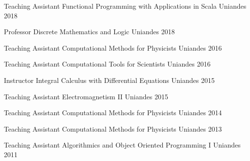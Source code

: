 


\begin{cvhonors}

    \cvhonor
    {Teaching Assistant}
    {Functional Programming with Applications in Scala}
    {Uniandes}
    {2018}

    \cvhonor
    {Professor}
    {Discrete Mathematics and Logic}
    {Uniandes}
    {2018}

    \cvhonor
    {Teaching Assistant} %
    {Computational Methods for Physicists} %
    {Uniandes} %
    {2016} %

    \cvhonor
    {Teaching Assistant} %
    {Computational Tools for Scientists} %
    {Uniandes} %
    {2016} %

    \cvhonor
    {Instructor} %
    {Integral Calculus with Differential Equations} %
    {Uniandes} %
    {2015} %
    
    \cvhonor
    {Teaching Assistant} %
    {Electromagnetism II} %
    {Uniandes} %
    {2015} %
    
    \cvhonor
    {Teaching Assistant} %
    {Computational Methods for Physicists} %
    {Uniandes} %
    {2014} %

    \cvhonor
    {Teaching Assistant} %
    {Computational Methods for Physicists} %
    {Uniandes} %
    {2013} %

    \cvhonor
    {Teaching Assistant} %
    {Algorithmics and Object Oriented Programming I} %
    {Uniandes} %
    {2011} %

\end{cvhonors}
